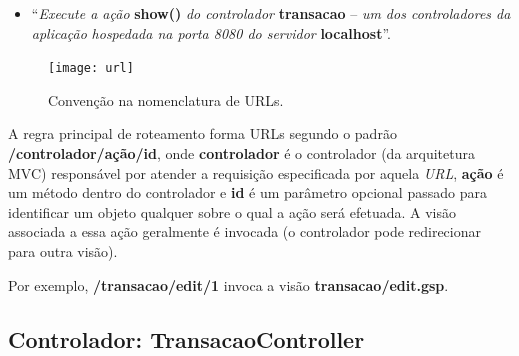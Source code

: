 \vspace{0.5cm}

\begin{itemize}

\item ``{\it Execute a ação} {\bf show()} {\it do controlador} {\bf transacao} –
  {\it  um dos  controladores  da aplicação}  {\it  hospedada na  porta 8080  do
    servidor} {\bf localhost}''.

\end{itemize}

\begin{figure}[htbp]
\centering\texttt{[image: url]}
\caption{Convenção na nomenclatura de URLs.}
\label{urlFig}
\end{figure}

A   regra  principal   de  roteamento   forma   URLs  segundo   o  padrão   {\bf
  /controlador/ação/id}, onde {\bf controlador}  é o controlador (da arquitetura
MVC) responsável  por atender  a requisição especificada  por aquela  {\it URL},
{\bf ação} é um método dentro do  controlador e {\bf id} é um parâmetro opcional
passado para identificar um objeto qualquer sobre o qual a ação será efetuada. A
visão  associada  a  essa  ação   geralmente  é  invocada  (o  controlador  pode
redirecionar para outra visão).  

\begin{cBox}
Por exemplo, {\bf /transacao/edit/1} invoca a visão {\bf transacao/edit.gsp}. 
\end{cBox}

\subsection{Controlador: TransacaoController}\label{secTransacaoController}
\

